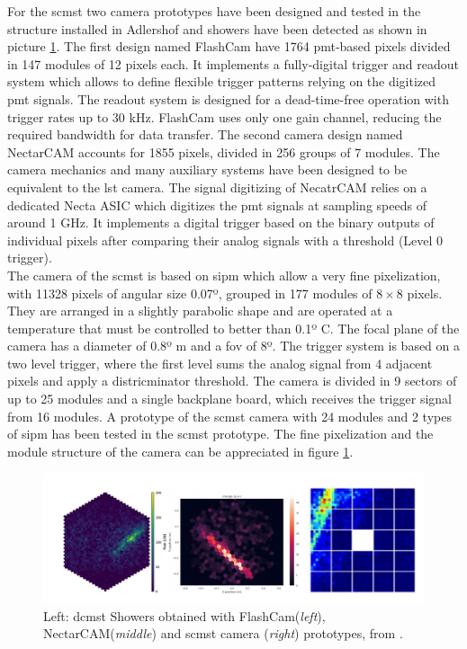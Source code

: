 \documentclass[main.tex]{subfiles}
\begin{document}
For the \gls{scmst} two camera prototypes have been designed and tested in the structure installed in Adlershof and showers have been detected as shown in picture \ref{fig:MSTcamerasimg}.
The first design named FlashCam have 1764 \gls{pmt}-based pixels divided in 147 modules of 12 pixels each. It implements a fully-digital trigger and readout system which allows to define flexible trigger patterns relying on the digitized \gls{pmt} signals. The readout system is designed for a dead-time-free operation with trigger rates up to 30 kHz. FlashCam uses only one gain channel, reducing the required bandwidth for data transfer. 
The second camera design named NectarCAM accounts for 1855 pixels, divided in 256 groups of 7 modules. The camera mechanics and many auxiliary systems have been designed to be equivalent to the \gls{lst} camera. The signal digitizing of NecatrCAM relies on a dedicated Necta ASIC which digitizes the \gls{pmt} signals at sampling speeds of around 1 GHz. It implements a digital trigger based on the binary outputs of individual pixels after comparing their analog signals with a threshold (Level 0 trigger).\\
The camera of the \gls{scmst} is based on \gls{sipm} which allow a very fine pixelization, with 11328 pixels of angular size 0.07º, grouped in 177 modules of $8\times8$ pixels. They are arranged in a slightly parabolic shape and are operated at a temperature that must be controlled to better than 0.1º C. The focal plane of the camera has a diameter of 0.8º m and a \gls{fov} of 8º. The trigger system is based on a two level trigger, where the first level sums the analog signal from 4 adjacent pixels and apply a districminator threshold. The camera is divided in 9 sectors of up to 25 modules and a single backplane board, which receives the trigger signal from 16 modules. A prototype of the \gls{scmst} camera with 24 modules and 2 types of \gls{sipm} has been tested in the \gls{scmst} prototype. The fine pixelization and the module structure of the camera can be appreciated in figure \ref{fig:MSTcamerasimg}. 

\begin{figure}
\centering
 \includegraphics[width=\textwidth]{Pictures/showerimagesMST.pdf}
  \caption{Left: \gls{dcmst} Showers obtained with FlashCam(\textit{left}), NectarCAM(\textit{middle}) and \gls{scmst} camera (\textit{right}) prototypes, from \cite{2019MSTreport}.}
    \label{fig:MSTcamerasimg}
\end{figure}
\end{document}
